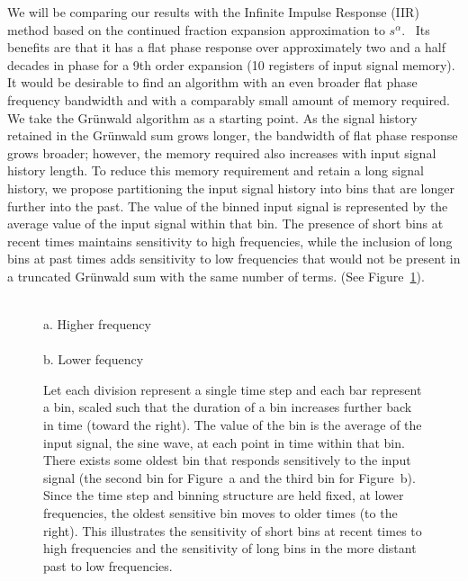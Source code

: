 We will be comparing our results with the Infinite Impulse Response (IIR) method 
based on the continued fraction expansion approximation to
$s^\alpha$.~\cite{Chen:04a} Its benefits are that it has a flat phase response over
approximately two and a half decades in phase for a 9th order
expansion (10 registers of input signal memory). It would be desirable
to find an algorithm with an even broader flat phase frequency
bandwidth and with a comparably small amount of memory required. We
take the Gr{\"u}nwald algorithm as a starting point. As the signal history
retained in the Gr{\"u}nwald sum grows longer, the bandwidth of flat phase
response grows broader; however, the memory required also increases
with input signal history length. To reduce this memory requirement
and retain a long signal history, we propose partitioning the input
signal history into bins that are longer further into the past. The
value of the binned input signal is represented by the average value
of the input signal within that bin. The presence of short bins at
recent times maintains sensitivity to high frequencies, while the 
inclusion of long bins at past times adds sensitivity to low frequencies 
that would not be present in a truncated Gr{\"u}nwald 
sum with the same number of terms. (See Figure~\ref{fig:freqScaling}).


\begin{figure}
\centering
{}
\\a. Higher frequency\\
\\b. Lower fequency
\caption{Let each division represent a single time step and each bar represent a bin, scaled such that the duration of a bin increases further back in time (toward the right). The value of the bin is the average of the input signal, the sine wave, at each point in time within that bin. There exists some oldest bin that responds sensitively to the input signal (the second bin for Figure~a and the third bin for Figure~b). Since the time step and binning structure are held fixed, at lower frequencies, the oldest sensitive bin moves to older times (to the right). This illustrates the sensitivity of short bins at recent times to high frequencies and the sensitivity of long bins in the  more distant past to low frequencies. }
\label{fig:freqScaling}
\end{figure}

